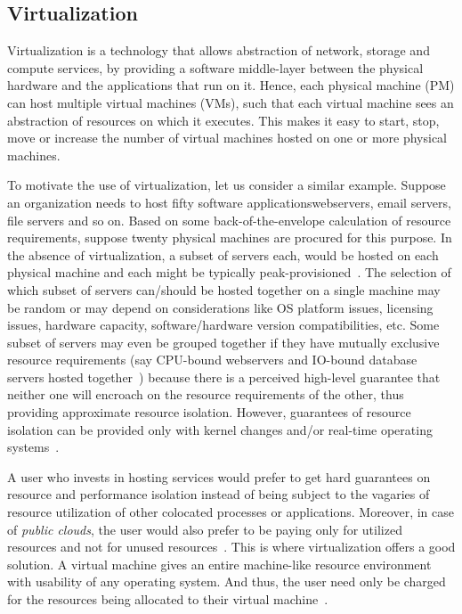 \subsection{Virtualization}
Virtualization is a technology that allows abstraction of network, storage
and compute services, by providing a software middle-layer between the
physical hardware and the applications that run on it.
Hence, each physical machine (PM) 
can host multiple virtual machines (VMs),
such that each virtual machine sees an
abstraction of resources on which it executes. This makes it easy
to start, stop, move or increase the number of virtual machines hosted
on one or more physical machines.

To motivate the use of virtualization, let us consider a similar example.
Suppose an organization needs to host fifty software 
applications\textemdash{}webservers, email servers, file servers and so on.
Based on some back-of-the-envelope calculation of resource requirements,
suppose twenty physical machines are procured for this purpose.
In the absence of virtualization, a subset of servers each, would be hosted
on each physical machine and each might be typically
peak-provisioned~\cite{berkeley-view}. 
The selection of which subset of servers can/should
be hosted together on a single machine may be random or may depend on
considerations like
OS platform issues, licensing issues, hardware capacity, software/hardware
version compatibilities, etc. Some subset of servers may even be grouped
together if they have mutually exclusive resource requirements (say
CPU-bound webservers and 
IO-bound database servers 
hosted together~\cite{dynamic-provisioning-multi-tier}) 
because there is a perceived high-level guarantee that neither 
one will encroach on the resource
requirements of the other, 
thus providing approximate resource isolation.
However, guarantees of resource isolation can be provided only with kernel 
changes and/or real-time operating systems~\cite{enforcing-isolation}.

A user who invests in hosting services would prefer to get hard guarantees
on resource and performance isolation instead of being subject
to the vagaries of resource utilization of other colocated processes
or applications. 
Moreover, in case of \textit{public clouds}, 
the user would also prefer to be paying only for
utilized resources and not for unused resources~\cite{berkeley-view}. This is
where virtualization offers a good solution. A virtual machine gives
an entire machine-like resource environment with usability of any
operating system. And thus, the user need only be charged for the resources
being allocated to their virtual machine~\cite{ec2}.

